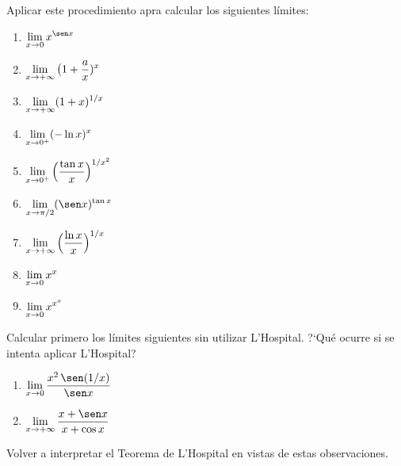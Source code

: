 Aplicar este procedimiento apra calcular los siguientes límites:
\begin{multicols}{2}
  \begin{enumerate}
    \item $\D \lim_{x\to 0}x^{\sen x}$
    \item $\displaystyle \lim_{x\to +\infty}\big(1+\frac ax)^x$
    \item $\displaystyle \lim_{x\to +\infty}(1+x)^{1/x}$
    \item $\displaystyle \lim_{x\to 0^+} (-\ln x)^x$
    \item $\displaystyle \lim_{x\to 0^+} \Big(\frac{\tan x}x\Big)^{1/x^2} $
    \item $\D \lim_{x\to \pi/2} (\sen x)^{\tan x}$
    \item $\displaystyle \lim_{x\to +\infty} \Big(\frac{\ln x}{x}\Big)^{1/x}$
    \item $\displaystyle \lim_{x\to 0} x^x$
    \item $\displaystyle \lim_{x\to 0} x^{x^x}$
  \end{enumerate}
\end{multicols}

\item Calcular primero los límites siguientes sin utilizar L'Hospital.
?`Qué ocurre si se intenta aplicar L'Hospital?
\begin{multicols}{2}
  \begin{enumerate}
    \item $\D \lim_{x\to 0}\frac{x^2\,\sen(1/x)}{\sen x}$
    \item $\D \lim_{x\to +\infty}\frac{x+\sen x}{x+\cos x}$
  \end{enumerate}
\end{multicols}
Volver a interpretar el Teorema de L'Hospital en vistas de estas observaciones.

